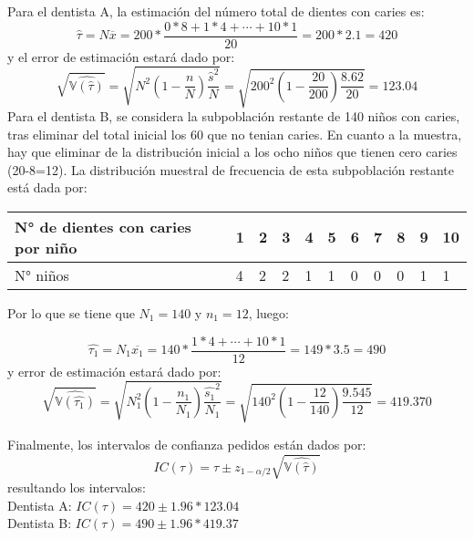 \begin{solution}
Para el dentista A, la estimación del número total de dientes con caries es:
$$\hat{\tau}=N\overline{x}=200*\dfrac{0*8+1*4+\cdots+10*1}{20}=200*2.1=420$$
y el error de estimación estará dado por:
$$\sqrt{\widehat{\mathbb{V}(\hat{\tau})}}=\sqrt{N^2\left(1-\dfrac{n}{N}\right)\dfrac{\hat{s}^2}{N}}=\sqrt{200^2\left(1-\dfrac{20}{200}\right)\dfrac{8.62}{20}}=123.04$$
Para el dentista B, se considera la subpoblación restante de 140 niños con caries, tras eliminar del total inicial los 60 que no tenian caries. En cuanto a la muestra, hay que eliminar de la distribución inicial a los ocho niños que tienen cero caries (20-8=12). La distribución muestral de frecuencia de esta subpoblación restante está dada por:



\begin{center}
\begin{tabular}{lllllllllll}
N° de dientes con caries por niño & 1 & 2 & 3 & 4 & 5 & 6 & 7 & 8 & 9 & 10 \\ \hline
N° niños                          & 4 & 2 & 2 & 1 & 1 & 0 & 0 & 0 & 1 & 1 
\end{tabular}
\end{center}

Por lo que se tiene que $N_1=140$ y $n_1=12$, luego:

$$\hat{\tau_1}=N_1\overline{x_1}=140*\dfrac{1*4+\cdots+10*1}{12}=149*3.5=490$$
y error de estimación estará dado por:
$$\sqrt{\widehat{\mathbb{V}(\hat{\tau_1})}}=\sqrt{N_{1}^{2}\left(1-\dfrac{n_1}{N_1}\right)\dfrac{\hat{s_1}^2}{N_1}}=\sqrt{140^2\left(1-\dfrac{12}{140}\right)\dfrac{9.545}{12}}=419.370$$

Finalmente, los intervalos de confianza pedidos están dados por:
$$IC(\tau)=\hat{\tau}\pm z_{1-\alpha/2} \sqrt{\widehat{\mathbb{V}(\hat{\tau})}}$$
resultando los intervalos:\\
Dentista A: $IC(\tau)=420 \pm 1.96 * 123.04$\\
Dentista B: $IC(\tau)=490 \pm 1.96 * 419.37$
\end{solution}

